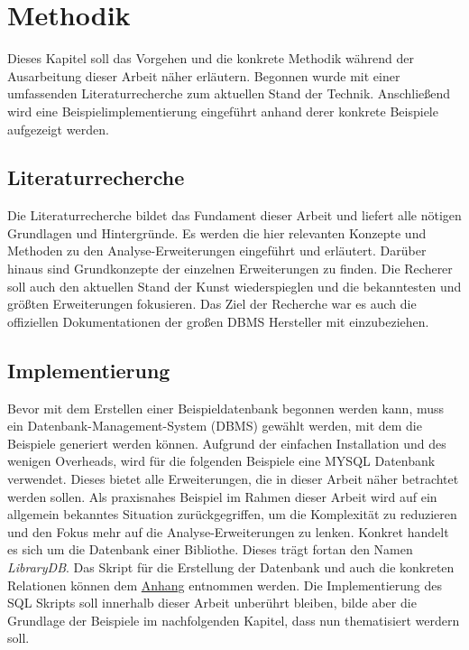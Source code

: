 \chapter{Methodik}
\label{chap:methodik} Dieses Kapitel soll das Vorgehen und die konkrete Methodik
während der Ausarbeitung dieser Arbeit näher erläutern. Begonnen wurde mit einer
umfassenden Literaturrecherche zum aktuellen Stand der Technik. Anschließend wird
eine Beispielimplementierung eingeführt anhand derer konkrete Beispiele aufgezeigt
werden.

\section{Literaturrecherche}
\label{sec:literaturrecherche} Die Literaturrecherche bildet das Fundament dieser
Arbeit und liefert alle nötigen Grundlagen und Hintergründe. Es werden die hier
relevanten Konzepte und Methoden zu den Analyse-Erweiterungen eingeführt und
erläutert. Darüber hinaus sind Grundkonzepte der einzelnen Erweiterungen zu finden.
Die Recherer soll auch den aktuellen Stand der Kunst wiederspieglen und die
bekanntesten und größten Erweiterungen fokusieren. Das Ziel der Recherche war es
auch die offiziellen Dokumentationen der großen DBMS Hersteller mit einzubeziehen.

\section{Implementierung}
\label{sec:implementierung} Bevor mit dem Erstellen einer Beispieldatenbank begonnen
werden kann, muss ein Datenbank-Management-System (DBMS) gewählt werden, mit dem
die Beispiele generiert werden können. Aufgrund der einfachen Installation und
des wenigen Overheads, wird für die folgenden Beispiele eine MYSQL Datenbank verwendet.
Dieses bietet alle Erweiterungen, die in dieser Arbeit näher betrachtet werden sollen.
Als praxisnahes Beispiel im Rahmen dieser Arbeit wird auf ein allgemein
bekanntes Situation zurückgegriffen, um die Komplexität zu reduzieren und den Fokus
mehr auf die Analyse-Erweiterungen zu lenken. Konkret handelt es sich um die
Datenbank einer Bibliothe. Dieses trägt fortan den Namen \textit{LibraryDB}. Das
Skript für die Erstellung der Datenbank und auch die konkreten Relationen können
dem \hyperref[sec:library_db]{Anhang} entnommen werden. Die Implementierung des
SQL Skripts soll innerhalb dieser Arbeit unberührt bleiben, bilde aber die Grundlage
der Beispiele im nachfolgenden Kapitel, dass nun thematisiert werdern soll.
